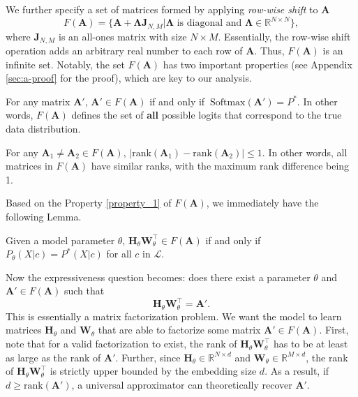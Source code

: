 We further specify a set of matrices formed by applying {\em row-wise shift} to $\mathbf{A}$
\[
F(\mathbf{A}) = \{\mathbf{A} + \mathbf{\Lambda} \mathbf{J}_{N,M} | \text{$\mathbf{\Lambda}$ is diagonal and } \mathbf{\Lambda} \in \mathbb{R}^{N \times N}\},
\]
where $\mathbf{J}_{N,M}$ is an all-ones matrix with size $N \times M$. Essentially, the row-wise shift operation adds an arbitrary real number to each row of $\mathbf{A}$. Thus, $F(\mathbf{A})$ is an infinite set. Notably, the set $F(\mathbf{A})$ has two important properties (see Appendix \ref{sec:a-proof} for the proof), which are key to our analysis.
\begin{property}\label{property_1}
    For any matrix $\mathbf{A}'$, $\mathbf{A}' \in F(\mathbf{A})$ if and only if $~\textrm{Softmax}(\mathbf{A}') = P^*$.
    In other words, $F(\mathbf{A})$ defines the set of \textbf{all} possible logits that correspond to the true data distribution.
\end{property}
\begin{property}\label{property_2}
	For any $\mathbf{A}_1 \neq \mathbf{A}_2 \in F(\mathbf{A})$, $|\textrm{rank}(\mathbf{A}_1) - \textrm{rank}(\mathbf{A}_2)| \leq 1$. In other words, all matrices in $F(\mathbf{A})$ have similar ranks, with the maximum rank difference being 1.
\end{property}
Based on the Property \ref{property_1} of $F(\mathbf{A})$, we immediately have the following Lemma.
\begin{lemma} \label{lemma}
Given a model parameter $\theta$, $\mathbf{H}_\theta \mathbf{W}^\top_\theta \in F(\mathbf{A})$ if and only if $P_\theta(X | c) = P^*(X | c)$ for all $c$ in $\mathcal{L}$.
\end{lemma}
Now the expressiveness question becomes: does there exist a parameter $\theta$ and $\mathbf{A}' \in F(\mathbf{A})$ such that 
\[ \mathbf{H}_\theta \mathbf{W}^\top_\theta = \mathbf{A}'.\]
This is essentially a matrix factorization problem. We want the model to learn matrices $\mathbf{H}_\theta$ and $\mathbf{W}_\theta$ that are able to factorize some matrix $\mathbf{A}' \in F(\mathbf{A})$.
First, note that for a valid factorization to exist, the rank of $\mathbf{H}_\theta \mathbf{W}_\theta^\top$ has to be at least as large as the rank of $\mathbf{A}'$. 
Further, since $\mathbf{H}_\theta \in \mathbb{R}^{N \times d}$ and $\mathbf{W}_\theta \in \mathbb{R}^{M \times d}$, the rank of $\mathbf{H}_\theta \mathbf{W}_\theta^\top$ is strictly upper bounded by the embedding size $d$.
As a result, if $d \geq \text{rank}(\mathbf{A}')$, a universal approximator can theoretically recover $\mathbf{A}'$.
